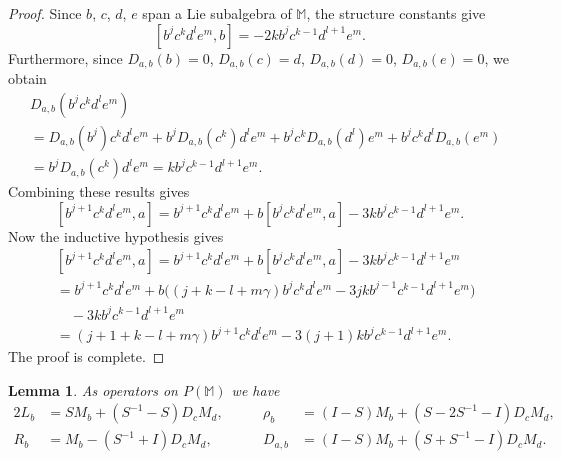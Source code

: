 \documentclass{amsart}
\theoremstyle{plain}
\newtheorem{lemma}{Lemma}[section]
\theoremstyle{definition}
\begin{document}
\begin{proof}
Since $b$, $c$, $d$, $e$ span a Lie subalgebra of $\mathbb{M}$, the structure
constants give
  \[
  [ b^j c^k d^l e^m, b ]
  =
  - 2k b^j c^{k-1} d^{l+1} e^m.
  \]
Furthermore, since $D_{a,b}(b) = 0$, $D_{a,b}(c) = d$, $D_{a,b}(d) = 0$,
$D_{a,b}(e) = 0$, we obtain
  \allowdisplaybreaks
  \begin{align*}
  &
  D_{a,b}( b^j  c^k d^l e^m )
  \\
  &=
  D_{a,b}( b^j ) c^k d^l e^m
  +
  b^j D_{a,b}( c^k ) d^l e^m
  +
  b^j  c^k D_{a,b}( d^l ) e^m
  +
  b^j  c^k d^l D_{a,b}( e^m )
  \\
  &=
  b^j D_{a,b}( c^k ) d^l e^m
  =
  k b^j c^{k-1} d^{l+1} e^m.
  \end{align*}
Combining these results gives
  \[
  [ b^{j+1} c^k d^l e^m, a ]
  =
  b^{j+1} c^k d^l e^m
  +
  b [ b^j c^k d^l e^m, a ]
  -
  3 k
  b^j c^{k-1} d^{l+1} e^m.
  \]
Now the inductive hypothesis gives
  \allowdisplaybreaks
  \begin{align*}
  &
  [ b^{j+1} c^k d^l e^m, a ]
  =
  b^{j+1} c^k d^l e^m
  +
  b [ b^j c^k d^l e^m, a ]
  -
  3 k
  b^j c^{k-1} d^{l+1} e^m
  \\
  &=
  b^{j+1} c^k d^l e^m
  +
  b
  \big(
  ( j{+}k{-}l{+}m \gamma )
  b^j c^k d^l e^m - 3 j k b^{j-1} c^{k-1} d^{l+1} e^m
  \big)
  \\
  &\quad
  -
  3 k
  b^j c^{k-1} d^ {l+1} e^m
  \\
  &=
  ( j+1+k-l+m \gamma )  b^{j+1} c^k d^l e^m
  -
  3 (j+1) k b^{j} c^{k-1} d^{l+1} e^m.
  \end{align*}
The proof is complete.
\end{proof}

\begin{lemma} \label{b-formulas}
As operators on $P(\mathbb{M})$ we have
  \allowdisplaybreaks
  \begin{alignat*}{2}
  L_b
  &=
  S M_b +  (  S^{-1} - S ) D_c M_d,
  &\qquad
  \rho_b
  &=
  ( I - S ) M_b + ( S - 2 S^{-1} -  I ) D_c M_d,
  \\
  R_b
  &=
  M_b - ( S^{-1} + I ) D_c M_d,
  &\qquad
  D_{a,b}
  &=
  ( I - S ) M_b + ( S + S^{-1} - I ) D_c M_d.
  \end{alignat*}
\end{lemma}
\end{document}
